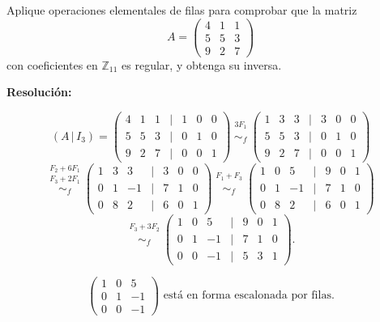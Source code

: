 \documentclass[a4paper,12pt]{article}
\begin{document}
\begin{ejercicio}[title=Ejercicio 13]
Aplique operaciones elementales de filas para comprobar que la matriz 
\[
A =
\begin{pmatrix}
4 & 1 & 1\\
5 & 5 & 3\\
9 & 2 & 7
\end{pmatrix}
\]
con coeficientes en $\mathbb{Z}_{11}$ es regular, y obtenga su inversa.

\tcblower
\textbf{Resolución:}

\[
(A \,|\, I_3) =
\begin{pmatrix}
4 & 1 & 1 &\Big|& 1 & 0 & 0\\
5 & 5 & 3 &\Big|& 0 & 1 & 0\\
9 & 2 & 7 &\Big|& 0 & 0 & 1
\end{pmatrix}
\overset{\substack{3F_1 \\ {}}}{\sim_f}
\begin{pmatrix}
1 & 3 & 3 &\Big|& 3 & 0 & 0\\
5 & 5 & 3 &\Big|& 0 & 1 & 0\\
9 & 2 & 7 &\Big|& 0 & 0 & 1
\end{pmatrix}
\]
\vspace{0.5em}
\[
\overset{\substack{F_2 + 6F_1 \\ F_3 + 2F_1}}{\sim_f}
\begin{pmatrix}
1 & 3 & 3 &\Big|& 3 & 0 & 0\\
0 & 1 & -1 &\Big|& 7 & 1 & 0\\
0 & 8 & 2 &\Big|& 6 & 0 & 1
\end{pmatrix}
\overset{\substack{F_1 + F_3 \\ {}}}{\sim_f}
\begin{pmatrix}
1 & 0 & 5 &\Big|& 9 & 0 & 1\\
0 & 1 & -1 &\Big|& 7 & 1 & 0\\
0 & 8 & 2 &\Big|& 6 & 0 & 1
\end{pmatrix}
\]
\[
\overset{\substack{F_3 + 3F_2 \\ {}}}{\sim_f}
\begin{pmatrix}
1 & 0 & 5 &\Big|& 9 & 0 & 1\\
0 & 1 & -1 &\Big|& 7 & 1 & 0\\
0 & 0 & -1 &\Big|& 5 & 3 & 1
\end{pmatrix}.
\]

\noindent
\[
\begin{pmatrix}
1 & 0 & 5\\
0 & 1 & -1\\
0 & 0 & -1
\end{pmatrix}
\text{ está en forma escalonada por filas.}
\]


\end{ejercicio}
\end{document}

